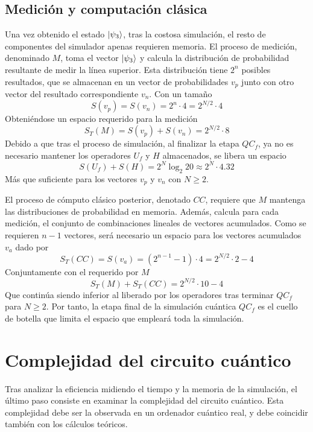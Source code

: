 \subsection{Medición y computación clásica}
Una vez obtenido el estado $\ket{\psi_{3}}$, tras la costosa simulación, el resto de 
componentes del simulador apenas requieren memoria.
El proceso de medición, denominado $M$, toma el vector $\ket{\psi_{3}}$ y calcula la 
distribución de probabilidad resultante de medir la línea superior. Esta 
distribución tiene $2^n$ posibles resultados, que se almacenan en un vector de 
probabilidades $v_p$ junto con otro vector del resultado correspondiente $v_n$.  
Con un tamaño
$$ S(v_p) = S(v_n) = 2^{n} \cdot 4 = 2^{N/2} \cdot 4 $$
Obteniéndose un espacio requerido para la medición
$$ S_T(M) = S(v_p) + S(v_n) = 2^{N/2} \cdot 8 $$
Debido a que tras el proceso de simulación, al finalizar la etapa $QC_f$, ya no 
es necesario mantener los operadores $U_f$ y $H$ almacenados, se libera un 
espacio
$$ S(U_f) + S(H) = 2^N \log_2 20 \approx 2^N \cdot 4.32$$
Más que suficiente para los vectores $v_p$ y $v_n$ con $N \geq 2$.

El proceso de cómputo clásico posterior, denotado $CC$, requiere que $M$ 
mantenga las distribuciones de probabilidad en memoria. Además, calcula para 
cada medición, el conjunto de combinaciones lineales de vectores acumulados.  
Como se requieren $n-1$ vectores, será necesario un espacio para los vectores 
acumulados $v_a$ dado por
$$ S_T(CC) = S(v_a) = (2^{n-1} - 1) \cdot 4 = 2^{N/2} \cdot 2 - 4$$
Conjuntamente con el requerido por $M$
$$ S_T(M) + S_T(CC) = 2^{N/2} \cdot 10 - 4 $$
Que continúa siendo inferior al liberado por los operadores tras terminar $QC_f$ 
para $N \geq 2$. Por tanto, la etapa final de la simulación cuántica $QC_f$ es 
el cuello de botella que limita el espacio que empleará toda la simulación.


\section{Complejidad del circuito cuántico}
Tras analizar la eficiencia midiendo el tiempo y la memoria de la simulación, el 
último paso consiste en examinar la complejidad del circuito cuántico. Esta 
complejidad debe ser la observada en un ordenador cuántico real, y debe 
coincidir también con los cálculos teóricos.

